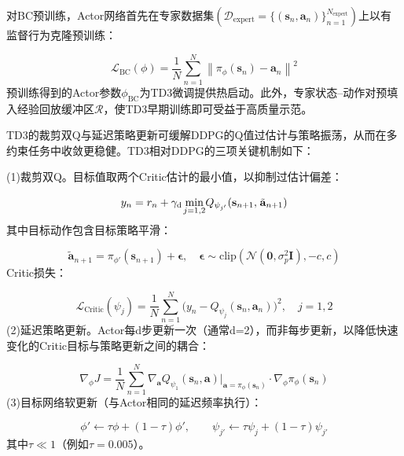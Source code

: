 对BC预训练，Actor网络首先在专家数据集$({\mathcal{D}_{{\text{expert}}}} = \{ ({{\mathbf{s}}_n},{{\mathbf{a}}_n})\} _{n = 1}^{{N_{{\text{expert}}}}})$上以有监督行为克隆预训练：

\begin{equation}
\label{eq:78}
{\mathcal{L}_{{\text{BC}}}}(\phi ) = \frac{1}{N}\sum\limits_{n = 1}^N {{{\left\| {{\pi _\phi }({{\mathbf{s}}_n}) - {{\mathbf{a}}_n}} \right\|}^2}} 
\end{equation}
预训练得到的Actor参数${\phi _{{\text{BC}}}}$为TD3微调提供热启动。此外，专家状态–动作对预填入经验回放缓冲区$\mathcal{R}$，使TD3早期训练即可受益于高质量示范。

TD3的裁剪双Q与延迟策略更新可缓解DDPG的Q值过估计与策略振荡，从而在多约束任务中收敛更稳健。TD3相对DDPG的三项关键机制如下：

(1)裁剪双Q。目标值取两个Critic估计的最小值，以抑制过估计偏差：

\begin{equation}
\label{eq:79}
{y_n} = {r_n} + \gamma _{\mathrm{d}} {\kern 1pt} {\min _{j = 1,2}}{Q_{{\psi _{j'}}}}({{\mathbf{s}}_{n + 1}},{\kern 1pt} {\tilde{\mathbf{a}}_{n + 1}})
\end{equation}
其中目标动作包含目标策略平滑：

\begin{equation}
\label{eq:80}
{\tilde{\mathbf{a}}_{n + 1}} = {\pi _{\phi '}}({{\mathbf{s}}_{n + 1}}) + {\boldsymbol{\epsilon }},\quad {\boldsymbol{\epsilon }} \sim {\text{clip}}\left( {\mathcal{N}({\mathbf{0}},\sigma _p^2{\mathbf{I}}), - c,c} \right)
\end{equation}
Critic损失：

\begin{equation}
\label{eq:81}
{\mathcal{L}_{{\text{Critic}}}}({\psi _j}) = \frac{1}{N}\sum\limits_{n = 1}^N ( {y_n} - {Q_{{\psi _j}}}({{\mathbf{s}}_n},{{\mathbf{a}}_n}){)^2},\quad j = 1,2
\end{equation}
(2)延迟策略更新。Actor每d步更新一次（通常d=2），而非每步更新，以降低快速变化的Critic目标与策略更新之间的耦合：

\begin{equation}
\label{eq:82}
{\nabla _\phi }J = \frac{1}{N}\sum\limits_{n = 1}^N {{\nabla _{\mathbf{a}}}} {Q_{{\psi _1}}}({{\mathbf{s}}_n},{\mathbf{a}}){|_{{\mathbf{a}} = {\pi _\phi }({{\mathbf{s}}_n})}} \cdot {\nabla _\phi }{\pi _\phi }({{\mathbf{s}}_n})
\end{equation}
(3)目标网络软更新（与Actor相同的延迟频率执行）：

\begin{equation}
\label{eq:83}
\phi ' \leftarrow \tau \phi  + (1 - \tau )\phi ',\qquad {\psi _{j'}} \leftarrow \tau {\psi _j} + (1 - \tau ){\psi _{j'}}
\end{equation}
其中$\tau  \ll 1$（例如$\tau  = 0.005$）。

